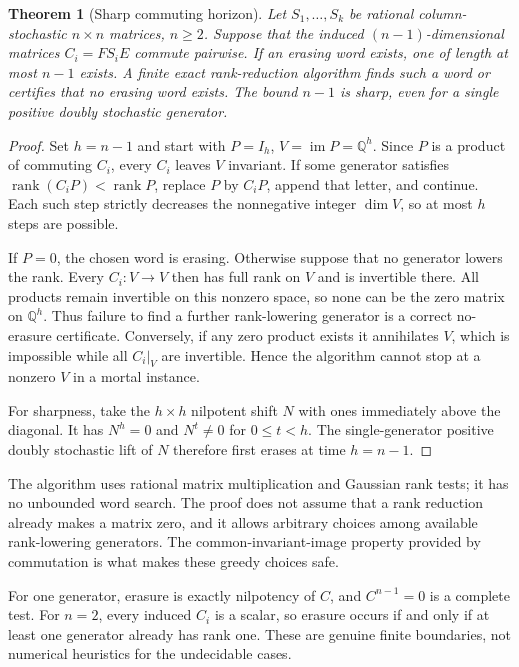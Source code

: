 \documentclass[11pt,letterpaper]{article}
\newtheorem{theorem}{Theorem}[section]
\theoremstyle{definition}
\theoremstyle{remark}
\newcommand{\Q}{\mathbb Q}
\newcommand{\rk}{\operatorname{rank}}
\newcommand{\im}{\operatorname{im}}
\begin{document}
\begin{theorem}[Sharp commuting horizon]\label{ste:ee:thm:commuting}
Let $S_1,\ldots,S_k$ be rational column-stochastic $n\times n$ matrices,
$n\geq2$. Suppose that the induced $(n-1)$-dimensional matrices
$C_i=FS_iE$ commute pairwise. If an erasing word exists, one of length at most
$n-1$ exists. A finite exact rank-reduction algorithm finds such a word or
certifies that no erasing word exists. The bound $n-1$ is sharp, even for a
single positive doubly stochastic generator.
\end{theorem}
\begin{proof}
Set $h=n-1$ and start with $P=I_h$, $V=\im P=\Q^h$. Since $P$ is a product of
commuting $C_i$, every $C_i$ leaves $V$ invariant. If some generator satisfies
$\rk(C_iP)<\rk P$, replace $P$ by $C_iP$, append that letter, and continue.
Each such step strictly decreases the nonnegative integer $\dim V$, so at most
$h$ steps are possible.

If $P=0$, the chosen word is erasing. Otherwise suppose that no generator lowers
the rank. Every $C_i:V\to V$ then has full rank on $V$ and is invertible there.
All products remain invertible on this nonzero space, so none can be the zero
matrix on $\Q^h$. Thus failure to find a further rank-lowering generator is a
correct no-erasure certificate. Conversely, if any zero product exists it
annihilates $V$, which is impossible while all $C_i|_V$ are invertible. Hence
the algorithm cannot stop at a nonzero $V$ in a mortal instance.

For sharpness, take the $h\times h$ nilpotent shift $N$ with ones immediately
above the diagonal. It has $N^{h}=0$ and $N^t\ne0$ for $0\leq t<h$. The
single-generator positive doubly stochastic lift of $N$ therefore first erases
at time $h=n-1$.
\end{proof}

The algorithm uses rational matrix multiplication and Gaussian rank tests; it
has no unbounded word search. The proof does not assume that a rank reduction
already makes a matrix zero, and it allows arbitrary choices among available
rank-lowering generators. The common-invariant-image property provided by
commutation is what makes these greedy choices safe.

For one generator, erasure is exactly nilpotency of $C$, and $C^{n-1}=0$ is a
complete test. For $n=2$, every induced $C_i$ is a scalar, so erasure occurs if and
only if at least one generator already has rank one. These are genuine finite
boundaries, not numerical heuristics for the undecidable cases.
\end{document}
